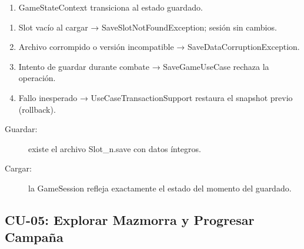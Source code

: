 \documentclass[stu,12pt,floatsintext]{apa7}
\begin{document}
\begin{description}
\begin{description}
\begin{enumerate}[label=\arabic*.]
                    \item GameStateContext transiciona al estado guardado.
                \end{enumerate}
        \end{description}
    \item[Flujo Alternativo:] \hfill
        \begin{enumerate}[label=FA-\arabic*:]
            \item Slot vacío al cargar → SaveSlotNotFoundException; sesión sin cambios.
            \item Archivo corrompido o versión incompatible → SaveDataCorruptionException.
            \item Intento de guardar durante combate → SaveGameUseCase rechaza la operación.
            \item Fallo inesperado → UseCaseTransactionSupport restaura el snapshot previo (rollback).
        \end{enumerate}
    \item[Poscondiciones:] \hfill
        \begin{description}
            \item[Guardar:] existe el archivo Slot\_n.save con datos íntegros.
            \item[Cargar:] la GameSession refleja exactamente el estado del momento del guardado.
        \end{description}
\end{description}


\subsection{CU-05: Explorar Mazmorra y Progresar Campaña}
\end{document}
